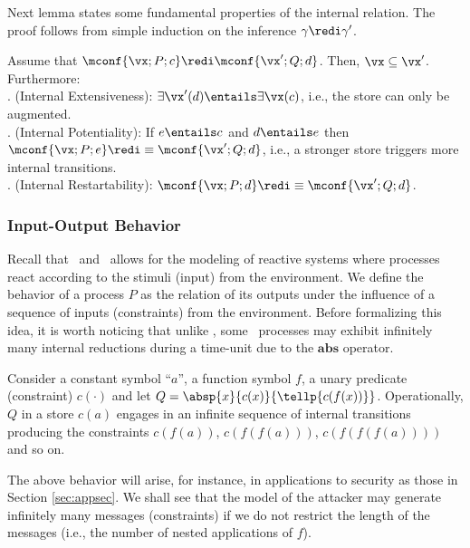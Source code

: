 \documentclass{tlp}
\begin{document}
Next lemma states some fundamental properties of the internal relation. The proof  follows from simple induction on the inference $\gamma \redi \gamma'$. 
\begin{lemma}\label{lemma:redi-properties}
Assume that $ \mconf{\vx; P;c}  \redi \mconf{\vx'; Q;d} $. Then, $\vx \subseteq \vx'$. Furthermore: 
\\. (Internal Extensiveness): $ \exists \vx' (d) \entails \exists \vx(c)$, i.e.,  the store can only be augmented. 
\\. (Internal Potentiality): If $e \entails  c$ and $d \entails  e$    then $\mconf{\vx; P; e} \redi\equiv  \mconf{\vx'; Q;d}$, i.e.,   a stronger store triggers more internal transitions. 
\\. (Internal Restartability): $\mconf{\vx; P;d}  \redi \equiv \mconf{\vx'; Q;d}$.
\end{lemma}
\subsubsection{Input-Output Behavior}
Recall that \tccp\ and \utcc\  allows for the modeling of reactive systems where processes react according to the stimuli (input) from the environment. We  define the behavior of a process $P$ as the relation of its outputs under the influence of a sequence of inputs (constraints) from the environment. Before  formalizing this idea, it is worth noticing that unlike \tccp, some \utcc\ 
processes may exhibit infinitely many internal reductions during a time-unit due to the $\mathbf{abs}$ operator. 

\begin{example}\label{ex:inf-behav}
Consider a constant symbol ``$a$'', a function symbol $f$, a unary predicate (constraint) $c(\cdot)$ and let $Q=\absp{x}{c(x)}{\tellp{c(f(x))}}$. Operationally, $Q$  in a store  $c(a)$  engages in an infinite sequence of internal transitions producing the constraints  $c(f(a))$, $c(f(f(a)))$, $c(f(f(f(a))))$ and so on. 
\end{example}
The above behavior will arise, for instance,  in applications to security as those in Section \ref{sec:appsec}. We shall see that  the model of the attacker may generate infinitely many messages (constraints) if we do not restrict the length  of the messages (i.e., the number of nested applications of  $f$). 
\end{document}
